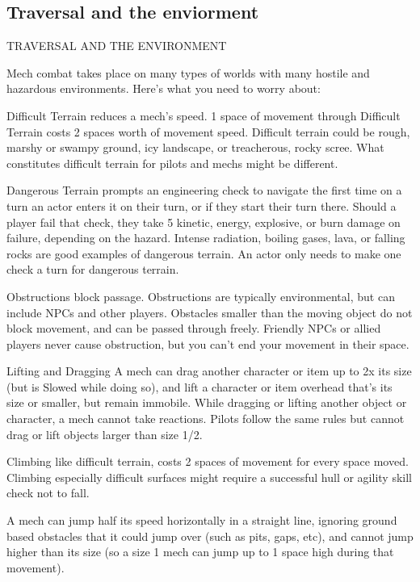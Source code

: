  
\subsection{Traversal and the enviorment}
                          TRAVERSAL AND THE ENVIRONMENT  

Mech combat takes place on many types of worlds with many hostile and hazardous  
environments. Here’s what you need to worry about:
 

                                                                                                             


Difficult Terrain reduces a mech’s speed. 1 space of movement through Difficult Terrain costs 2  
spaces worth of movement speed. Difficult terrain could be rough, marshy or swampy ground,  
icy landscape, or treacherous, rocky scree. What constitutes difficult terrain for pilots and mechs  
might be different.
 

Dangerous Terrain prompts an engineering check to navigate the first time on a turn an actor  
enters it on their turn, or if they start their turn there. Should a player fail that check, they take 5  
kinetic, energy, explosive, or burn damage on failure, depending on the hazard. Intense radiation,  
boiling gases, lava, or falling rocks are good examples of dangerous terrain. An actor only needs  
to make one check a turn for dangerous terrain.
 

Obstructions block passage. Obstructions are typically environmental, but can include NPCs  
and other players. Obstacles smaller than the moving object do not block movement, and  
can be passed through freely. Friendly NPCs or allied players never cause obstruction, but  
you can’t end your movement in their space.
 

Lifting and  Dragging  
A mech can drag another character or item up to 2x its size (but is Slowed while doing so), and  
lift a character or item overhead that’s its size or smaller, but remain immobile. While dragging or  
lifting another object or character, a mech cannot take reactions. Pilots follow the same rules but  
cannot drag or lift objects larger than size 1/2.
 

Climbing like difficult terrain, costs 2 spaces of movement for every space moved. Climbing  
especially difficult surfaces might require a successful hull or agility skill check not to fall.
 

A mech can jump half its speed horizontally in a straight line, ignoring ground based obstacles  
that it could jump over (such as pits, gaps, etc), and cannot jump higher than its size (so a size 1  
mech can jump up to 1 space high during that movement).
 
